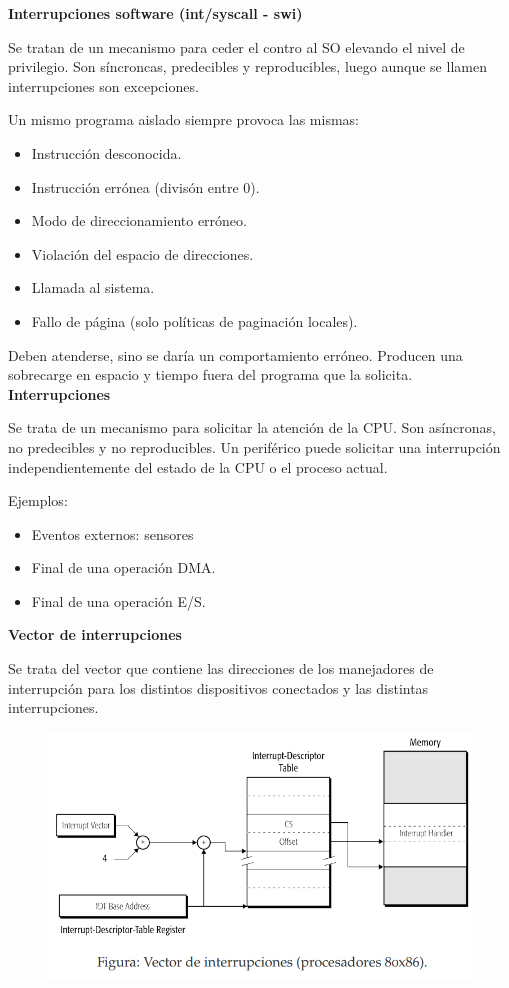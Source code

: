 \documentclass{article}
\begin{document}
\textbf{Interrupciones software (int/syscall - swi)}

Se tratan de un mecanismo para ceder el contro al SO elevando el nivel de privilegio. Son síncroncas, predecibles y reproducibles, luego aunque se llamen interrupciones son excepciones. 

Un mismo programa aislado siempre provoca las mismas:
\begin{itemize}
\item Instrucción desconocida.
\item Instrucción errónea (divisón entre 0).
\item Modo de direccionamiento erróneo.
\item Violación del espacio de direcciones.
\item Llamada al sistema.
\item Fallo de página (solo políticas de paginación locales).
\end{itemize}

Deben atenderse, sino se daría un comportamiento erróneo. Producen una sobrecarge en espacio y tiempo fuera del programa que la solicita.\\

\textbf{Interrupciones}

Se trata de un mecanismo para solicitar la atención de la CPU. Son asíncronas, no predecibles y no reproducibles. Un periférico puede solicitar una interrupción independientemente del estado de la CPU o el proceso actual.

Ejemplos:
\begin{itemize}
\item Eventos externos: sensores
\item Final de una operación DMA.
\item Final de una operación E/S.
\end{itemize}

\textbf{Vector de interrupciones}

Se trata del vector que contiene las direcciones de los manejadores de interrupción para los distintos dispositivos conectados y las distintas interrupciones.

\begin{figure}[h]
\centering
\includegraphics[scale=1,width=\textwidth]{vectorint.png}
\end{figure}
\end{document}
